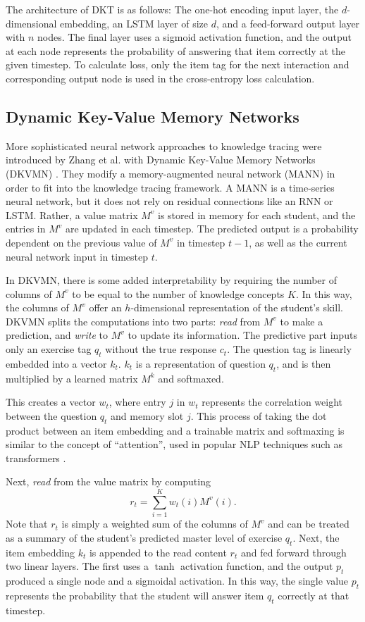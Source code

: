   The architecture of DKT is as follows: The one-hot encoding input layer, the $d$-dimensional embedding, an LSTM layer of size $d$, and a feed-forward output layer with $n$ nodes. The final layer uses a sigmoid activation function, and the output at each node represents the probability of answering that item correctly at the given timestep. To calculate loss, only the item tag for the next interaction and corresponding output node is used in the cross-entropy loss calculation.

  \subsection{Dynamic Key-Value Memory Networks}\label{sec:dkvmn}
More sophisticated neural network approaches to knowledge tracing were introduced by Zhang et al. with Dynamic Key-Value Memory Networks (DKVMN) \cite{zhang2017}. They modify a memory-augmented neural network (MANN) in order to fit into the knowledge tracing framework. A MANN is a time-series neural network, but it does not rely on residual connections like an RNN or LSTM. Rather, a value matrix $M^v$ is stored in memory for each student, and the entries in $M^v$ are updated in each timestep. The predicted output is a probability dependent on the previous value of $M^v$ in timestep $t-1$, as well as the current neural network input in timestep $t$.

In DKVMN, there is some added interpretability by requiring the number of columns of $M^v$ to be equal to the number of knowledge concepts $K$. In this way, the columns of $M^v$ offer an $h$-dimensional representation of the student's skill. DKVMN splits the computations into two parts: \textit{read} from $M^v$ to make a prediction, and \textit{write} to $M^v$ to update its information. The predictive part inputs only an exercise tag $q_t$ without the true response $c_t$. The question tag is linearly embedded into a vector $k_t$. $k_t$ is a representation of question $q_t$, and is then multiplied by a learned matrix $M^k$ and softmaxed. 

This creates a vector $w_t$, where entry $j$ in $w_t$ represents the correlation weight between the question $q_t$ and memory slot $j$. This process of taking the dot product between an item embedding and a trainable matrix and softmaxing is similar to the concept of ``attention'', used in popular NLP techniques such as transformers \cite{vaswani2017}.

Next, \textit{read} from the value matrix by computing 
\begin{equation}
  r_t = \sum_{i=1}^K w_t(i) M^v(i).
  \label{eq:dkvmn_read}
\end{equation}
Note that $r_t$ is simply a weighted sum of the columns of $M^v$ and can be treated as a summary of the student's predicted master level of exercise $q_t$. Next, the item embedding $k_t$ is appended to the read content $r_t$ and fed forward through two linear layers. The first uses a $\tanh$ activation function, and the output $p_t$ produced a single node and a sigmoidal activation. In this way, the single value $p_t$ represents the probability that the student will answer item $q_t$ correctly at that timestep.

